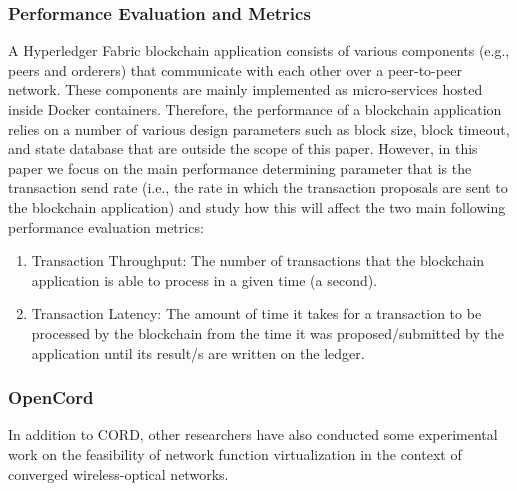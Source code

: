\subsubsection{Performance Evaluation and Metrics}
A Hyperledger Fabric blockchain application consists of various components (e.g., peers and orderers) that communicate with each other over a peer-to-peer network. These components are mainly implemented as micro-services hosted inside Docker containers. Therefore, the performance of a blockchain application relies on a number of various design parameters such as block size, block timeout, and state database \cite{8526892} that are outside the scope of this paper. However, in this paper we focus on the main performance determining parameter that is the transaction send rate (i.e., the rate in which the transaction proposals are sent to the blockchain application) and study how this will affect the two main following performance evaluation metrics:

\begin{enumerate}
    \item Transaction Throughput: The number of transactions that the blockchain application is able to process in a given time (a second).
    \item Transaction Latency: The amount of time it takes for a transaction to be processed by the blockchain from the time it was proposed/submitted by the application until its result/s are written on the ledger.
\end{enumerate}






\subsubsection{OpenCord}

In addition to CORD, other researchers have also conducted some experimental work on the feasibility of network function virtualization in the context of converged wireless-optical networks.




